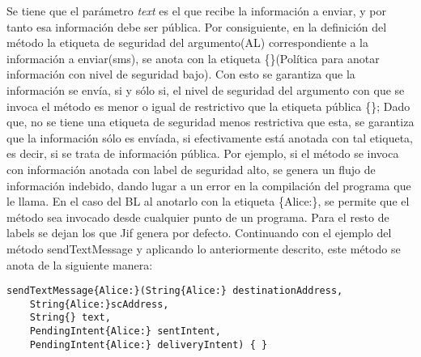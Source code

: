 Se tiene que el parámetro \emph{text} es el que recibe la información a enviar,
y por tanto esa información debe ser pública.\newline 
Por consiguiente, en la definición del método la etiqueta de seguridad del
argumento(AL) correspondiente a la información a enviar(sms), se anota con la
etiqueta \{\}(Política para anotar información con nivel de seguridad bajo). Con
esto se garantiza que la información se envía, si y sólo si, el nivel de
seguridad del argumento con que se invoca el método es menor o igual de
restrictivo que la etiqueta pública \{\}; Dado que, no se tiene una etiqueta de
seguridad menos restrictiva que esta, se garantiza que la información sólo es
envíada, si efectivamente está anotada con tal etiqueta, es decir, si se trata
de información pública.\newline 
Por ejemplo,
si el método se invoca con información anotada con label de seguridad alto, se
genera un flujo de información indebido, dando lugar a un error en la
compilación del programa que le llama.\newline 
En el caso del BL al anotarlo con la etiqueta \{Alice:\}, se permite que el
método sea invocado desde cualquier punto de un programa. 
Para el resto de labels se dejan los que Jif genera por defecto.\newline
Continuando con el ejemplo del método sendTextMessage y aplicando lo
anteriormente descrito, este método se anota de la siguiente manera:
\begin{lstlisting}[basicstyle=\scriptsize]
sendTextMessage{Alice:}(String{Alice:} destinationAddress, 
	String{Alice:}scAddress, 
	String{} text, 
	PendingIntent{Alice:} sentIntent,
	PendingIntent{Alice:} deliveryIntent) { }
\end{lstlisting}

